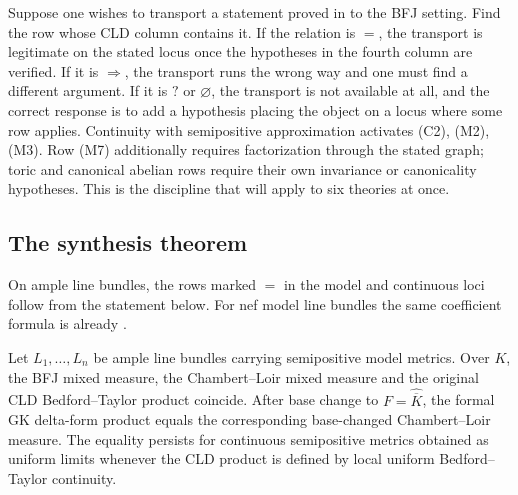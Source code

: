 \begin{remark}
\label{rem:ch31-how-to-use}
Suppose one wishes to transport a statement proved in  to the
BFJ setting.  Find the row whose CLD column contains it.  If the relation is
$=$, the transport is legitimate on the stated locus once the hypotheses
in the fourth column are verified.  If it is $\Rightarrow$, the transport
runs the wrong way and one must find a different argument.  If it is
$?$ or $\varnothing$, the transport is not available at all, and the
correct response is to add a hypothesis placing the object on a locus where
some row applies.  Continuity with semipositive approximation activates
(C2), (M2), (M3).  Row (M7) additionally requires factorization through
the stated graph; toric and canonical abelian rows require their own
invariance or canonicality hypotheses.  This is the discipline that  will
apply to six theories at once.
\end{remark}

\subsection{The synthesis theorem}
\label{sec:ch31-synthesis-theorem}

On ample line bundles, the rows marked $=$ in the model and continuous
loci follow from the statement below.  For nef model line bundles the
same coefficient formula is already .

\begin{theorem}
\label{thm:bfj-cld-common-locus-synthesis}
Let $L_1,\ldots,L_n$ be ample line bundles carrying semipositive model
metrics.  Over $K$, the BFJ mixed measure, the Chambert--Loir mixed measure
and the original CLD Bedford--Taylor product coincide.  After base change
to $F=\widehat{\overline K}$, the formal GK delta-form product equals the
corresponding base-changed Chambert--Loir measure.  The equality persists
for continuous semipositive metrics obtained as uniform limits whenever the
CLD product is defined by local uniform Bedford--Taylor continuity.
\end{theorem}

